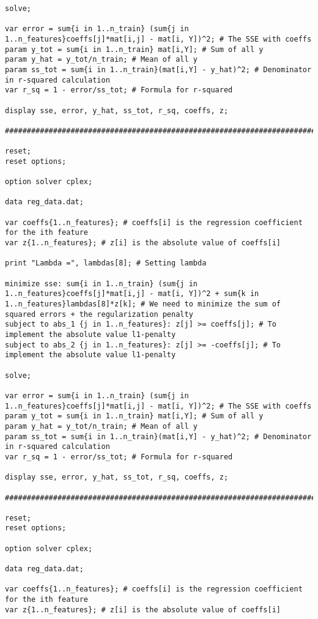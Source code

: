 \documentclass[15pt,a4paper,openright]{article}
\begin{document}
\begin{lstlisting}[language=AMPL, caption=1c Code]
solve;

var error = sum{i in 1..n_train} (sum{j in 1..n_features}coeffs[j]*mat[i,j] - mat[i, Y])^2; # The SSE with coeffs
param y_tot = sum{i in 1..n_train} mat[i,Y]; # Sum of all y
param y_hat = y_tot/n_train; # Mean of all y
param ss_tot = sum{i in 1..n_train}(mat[i,Y] - y_hat)^2; # Denominator in r-squared calculation
var r_sq = 1 - error/ss_tot; # Formula for r-squared

display sse, error, y_hat, ss_tot, r_sq, coeffs, z;

#############################################################################

reset;
reset options;

option solver cplex;

data reg_data.dat;

var coeffs{1..n_features}; # coeffs[i] is the regression coefficient for the ith feature
var z{1..n_features}; # z[i] is the absolute value of coeffs[i]

print "Lambda =", lambdas[8]; # Setting lambda

minimize sse: sum{i in 1..n_train} (sum{j in 1..n_features}coeffs[j]*mat[i,j] - mat[i, Y])^2 + sum{k in 1..n_features}lambdas[8]*z[k]; # We need to minimize the sum of squared errors + the regularization penalty
subject to abs_1 {j in 1..n_features}: z[j] >= coeffs[j]; # To implement the absolute value l1-penalty
subject to abs_2 {j in 1..n_features}: z[j] >= -coeffs[j]; # To implement the absolute value l1-penalty

solve;

var error = sum{i in 1..n_train} (sum{j in 1..n_features}coeffs[j]*mat[i,j] - mat[i, Y])^2; # The SSE with coeffs
param y_tot = sum{i in 1..n_train} mat[i,Y]; # Sum of all y
param y_hat = y_tot/n_train; # Mean of all y
param ss_tot = sum{i in 1..n_train}(mat[i,Y] - y_hat)^2; # Denominator in r-squared calculation
var r_sq = 1 - error/ss_tot; # Formula for r-squared

display sse, error, y_hat, ss_tot, r_sq, coeffs, z;

#############################################################################

reset;
reset options;

option solver cplex;

data reg_data.dat;

var coeffs{1..n_features}; # coeffs[i] is the regression coefficient for the ith feature
var z{1..n_features}; # z[i] is the absolute value of coeffs[i]


\end{lstlisting}
\end{document}
